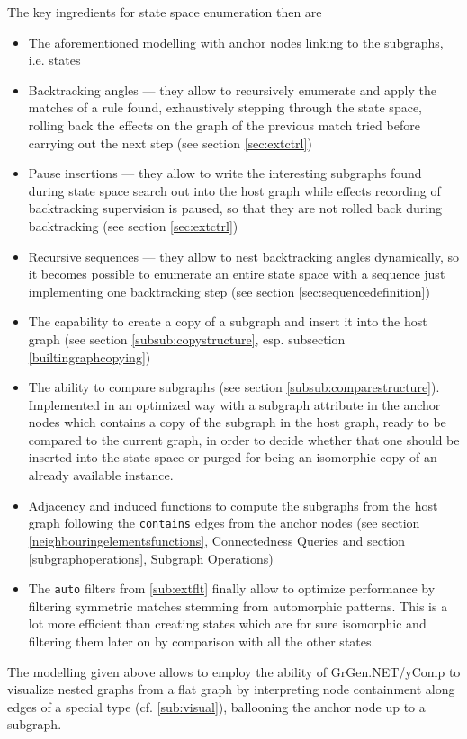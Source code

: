 The key ingredients for state space enumeration then are
\begin{itemize}
	\item The aforementioned modelling with anchor nodes linking to the subgraphs, i.e. states
	\item Backtracking angles --- they allow to recursively enumerate and apply the matches of a rule found, exhaustively stepping through the state space, rolling back the effects on the graph of the previous match tried before carrying out the next step (see section \ref{sec:extctrl})
	\item Pause insertions --- they allow to write the interesting subgraphs found during state space search out into the host graph while effects recording of backtracking supervision is paused, so that they are not rolled back during backtracking (see section \ref{sec:extctrl})
	\item Recursive sequences --- they allow to nest backtracking angles dynamically, so it becomes possible to enumerate an entire state space with a sequence just implementing one backtracking step (see section \ref{sec:sequencedefinition})
	\item The capability to create a copy of a subgraph and insert it into the host graph (see section \ref{subsub:copystructure}, esp. subsection \ref{builtingraphcopying})
	\item The ability to compare subgraphs (see section \ref{subsub:comparestructure}).
Implemented in an optimized way with a subgraph attribute in the anchor nodes which contains a copy of the subgraph in the host graph, ready to be compared to the current graph, in order to decide whether that one should be inserted into the state space or purged for being an isomorphic copy of an already available instance. 
	\item Adjacency and induced functions to compute the subgraphs from the host graph following the \texttt{contains} edges from the anchor nodes (see section \ref{neighbouringelementsfunctions}, Connectedness Queries and section \ref{subgraphoperations}, Subgraph Operations)
	\item The \texttt{auto} filters from \ref{sub:extflt} finally allow to optimize performance by filtering symmetric matches stemming from automorphic patterns. This is a lot more efficient than creating states which are for sure isomorphic and filtering them later on by comparison with all the other states.
\end{itemize}

The modelling given above allows to employ the ability of GrGen.NET/yComp to visualize nested graphs from a flat graph by interpreting node containment along edges of a special type (cf. \ref{sub:visual}), ballooning the anchor node up to a subgraph. 

